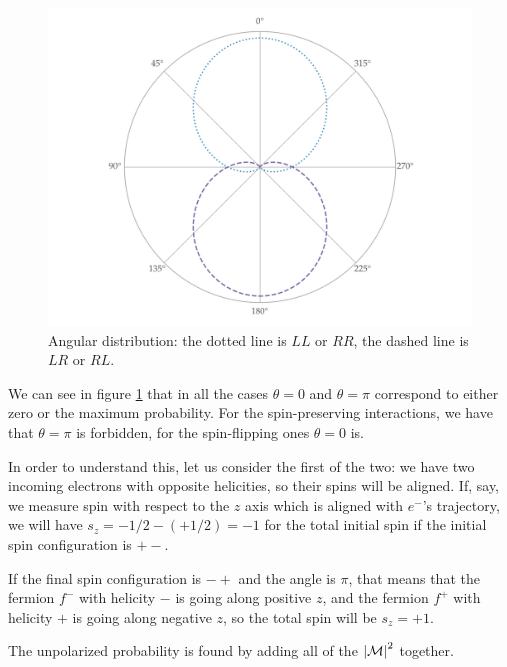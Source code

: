 \documentclass[main.tex]{subfiles}
\begin{document}
\begin{figure}[ht]
\centering
\includegraphics[width=\textwidth]{figures/angular_distribution.png}
\caption{Angular distribution: the dotted line is \(LL\) or \(RR \), the dashed line is \(LR\) or \(RL\). }
\label{fig:angular_distribution}
\end{figure}

We can see in figure \ref{fig:angular_distribution} that in all the cases \(\theta = 0\) and \(\theta = \pi \) correspond to either zero or the maximum probability. 
For the spin-preserving interactions, we have that \(\theta = \pi \) is forbidden, for the spin-flipping ones \(\theta = 0\) is. 

In order to understand this, let us consider the first of the two: we have two incoming electrons with opposite helicities, so their spins will be aligned. 
If, say, we measure spin with respect to the \(z\) axis which is aligned with \(e^{-}\)'s trajectory, we will have \(s_z = -1/2 - (+ 1/2) = -1\) for the total initial spin if the initial spin configuration is \(+ -\).

If the final spin configuration is \(- +\) and the angle is \(\pi \), that means that the fermion \(f^{-}\) with helicity \(-\) is going along positive \(z\), and the fermion \(f^{+}\) with helicity \(+\) is going along negative \(z\), so the total spin will be \(s_z = +1\). 


The unpolarized probability is found by adding all of the \(\abs{\mathcal{M}}^2\) together. 
\end{document}
